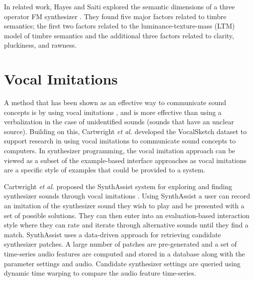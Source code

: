 In related work, Hayes and Saiti explored the semantic dimensions of a three operator FM synthesizer \cite{hayes2020there}. %
They found five major factors related to timbre semantics; the first two factors related to the  luminance-texture-mass (LTM) model of timbre semantics \cite{zacharakis2012interlanguage} and the additional three factors related to clarity, pluckiness, and rawness.


\section{Vocal Imitations}
A method that has been shown as an effective way to communicate sound concepts is by using vocal imitations \cite{lemaitre2014effectiveness}, and is more effective than using a verbalization in the case of unidentified sounds (sounds that have an unclear source). Building on this, Cartwright \textit{et al.} developed the VocalSketch dataset \cite{cartwright2015vocalsketch} to support research in using vocal imitations to communicate sound concepts to computers. In synthesizer programming, the vocal imitation approach can be viewed as a subset of the example-based interface approaches as vocal imitations are a specific style of examples that could be provided to a system.

Cartwright \textit{et al.} proposed the SynthAssist system for exploring and finding synthesizer sounds through vocal imitations \cite{cartwright2014synthassist}. Using SynthAssist a user can record an imitation of the synthesizer sound they wish to play and be presented with a set of possible solutions. They can then enter into an evaluation-based interaction style where they can rate and iterate through alternative sounds until they find a match. SynthAssist uses a data-driven approach for retrieving candidate synthesizer patches. A large number of patches are pre-generated and a set of time-series audio features are computed and stored in a database along with the parameter settings and audio. Candidate synthesizer settings are queried using dynamic time warping to compare the audio feature time-series. 


